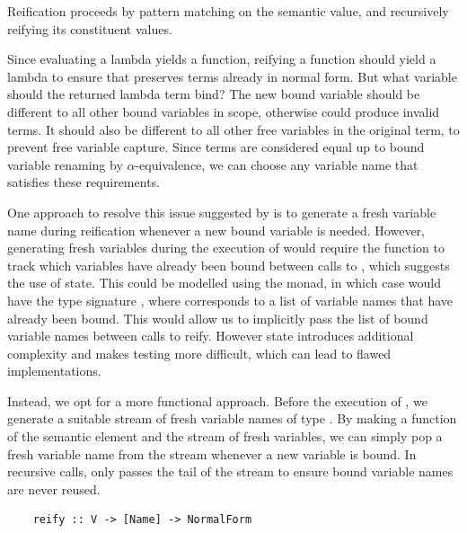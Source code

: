 
Reification proceeds by pattern matching on the semantic value, and recursively reifying its constituent values.

Since evaluating a lambda yields a function, reifying a function should yield a lambda to ensure that  preserves terms already in normal form. But what variable should the returned lambda term bind? The new bound variable should be different to all other bound variables in scope, otherwise  could produce invalid terms. It should also be different to all other free variables in the original term, to prevent free variable capture. Since terms are considered equal up to bound variable renaming by $\alpha$-equivalence, we can choose any variable name that satisfies these requirements. 

One approach to resolve this issue suggested by \cite{slides} is to generate a fresh variable name during reification whenever a new bound variable is needed. However, generating fresh variables during the execution of  would require the function to track which variables have already been bound between calls to , which suggests the use of state. This could be modelled using the  monad, in which case  would have the type signature , where \code{[Name]} corresponds to a list of variable names that have already been bound. This would allow us to implicitly pass the list of bound variable names between calls to reify. However state introduces additional complexity and makes testing more difficult, which can lead to flawed implementations.


Instead, we opt for a more functional approach. Before the execution of , we generate a suitable stream of fresh variable names of type \code{[Name]}. By making  a function of the semantic element and the stream of fresh variables, we can simply pop a fresh variable name from the stream whenever a new variable is bound. In recursive calls,  only passes the tail of the stream to ensure bound variable names are never reused.

\begin{lstlisting}
    reify :: V -> [Name] -> NormalForm
\end{lstlisting}

